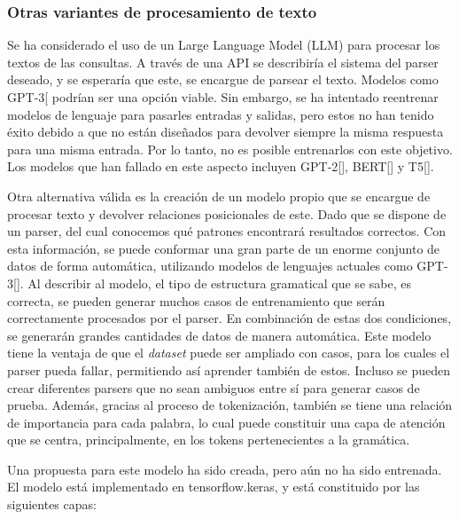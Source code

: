 \subsubsection{Otras variantes de procesamiento de texto }
Se ha considerado el uso de un Large Language Model (LLM) para procesar los textos de las consultas. A través de una API se describiría el sistema del parser deseado, y se esperaría que este, se encargue de parsear el texto. Modelos como GPT-3[\cite{gpt3} podrían ser una opción viable. Sin embargo, se ha intentado reentrenar modelos de lenguaje para pasarles entradas y salidas, pero estos no han tenido éxito debido a que no están diseñados para devolver siempre la misma respuesta para una misma entrada. Por lo tanto, no es posible entrenarlos con este objetivo. Los modelos que han fallado en este aspecto incluyen GPT-2[\cite{gpt2}], BERT[\cite{bert}] y T5[\cite{t5}].

Otra alternativa v\'alida es la creación de un modelo propio que se encargue de procesar texto y devolver relaciones posicionales de este. Dado que se dispone de un parser, del cual conocemos qu\'e patrones encontrará resultados correctos. Con esta información, se puede conformar una gran parte de un enorme conjunto de datos de forma automática, utilizando modelos de lenguajes actuales como GPT-3[\cite{gpt3}]. Al describir al modelo, el tipo de estructura gramatical que se sabe, es correcta, se pueden generar muchos casos de entrenamiento que ser\'an correctamente procesados por el parser. En combinación de estas dos condiciones, se generarán grandes cantidades de datos de manera automática. Este modelo tiene la ventaja de que el \textit{dataset} puede ser ampliado con casos, para los cuales el parser pueda fallar, permitiendo así aprender tambi\'en de estos. Incluso se pueden crear diferentes parsers que no sean ambiguos entre sí para generar casos de prueba. Adem\'as, gracias al proceso de tokenizaci\'on, tambi\'en se tiene una relaci\'on de importancia para cada palabra, lo cual puede constituir una capa de atenci\'on que se centra, principalmente, en los tokens pertenecientes a la gram\'atica.

Una propuesta para este modelo ha sido creada, pero aún no ha sido entrenada. El modelo está implementado en tensorflow.keras, y est\'a constituido por las siguientes capas:

